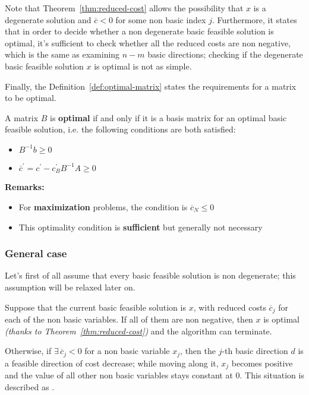 \documentclass[english]{article}
\begin{document}
\bigskip
Note that Theorem~\ref{thm:reduced-cost} allows the possibility that \(x\) is a degenerate solution and \(\overline{c} < 0\) for some non basic index \(j\).
Furthermore, it states that in order to decide whether a non degenerate basic feasible solution is optimal, it's sufficient to check whether all the reduced costs are non negative, which is the same as examining \(n-m\) basic directions;
checking if the degenerate basic feasible solution \(x\) is optimal is not as simple.

Finally, the Definition~\ref{def:optimal-matrix} states the requirements for a matrix to be optimal.

\begin{definition}
  A matrix \(B\) is \textbf{optimal} if and only if it is a basis matrix for an optimal basic feasible solution, i.e. the following conditions are both satisfied:

  \begin{itemize}
    \item \(B^{-1} b \geq 0\)
    \item \(\overline{c}^\prime = c^\prime - c^\prime_B B^{-1} A \geq 0\)
  \end{itemize}
  \label{def:optimal-matrix}
\end{definition}

\bigskip
\textbf{Remarks:}
\begin{itemize}[label=\(\rightarrow\)]
  \item For \textbf{maximization} problems, the condition is \(\overline{c}_N \leq 0\)
  \item This optimality condition is \textbf{sufficient} but generally not necessary
\end{itemize}

\subsubsection{General case}

Let's first of all assume that every basic feasible solution is non degenerate;
this assumption will be relaxed later on.

Suppose that the current basic feasible solution is \(x\), with reduced costs \(\overline{c}_j\) for each of the non basic variables.
If all of them are non negative, then \(x\) is optimal \textit{(thanks to Theorem~\ref{thm:reduced-cost})} and the algorithm can terminate.

Otherwise, if \(\exists \, \overline{c}_j < 0\) for a non basic variable \(x_j\), then the \(j\)-th basic direction \(d\) is a feasible direction of cost decrease;
while moving along it, \(x_j\) becomes positive and the value of all other non basic variables stays constant at \(0\).
This situation is described as .
\end{document}
